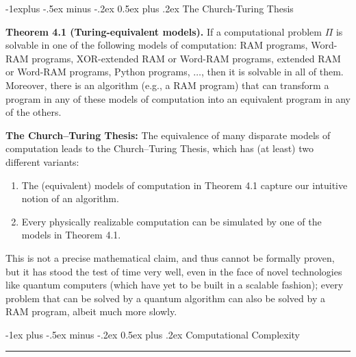 \documentclass[10pt,landscape]{article}
\makeatletter
\renewcommand{\section}{\@startsection{section}{1}{0mm}%
                                {-1ex plus -.5ex minus -.2ex}%
                                {0.5ex plus .2ex}%
                                {\normalfont\large\bfseries}}
\renewcommand{\subsection}{\@startsection{subsection}{2}{0mm}%
                                {-1explus -.5ex minus -.2ex}%
                                {0.5ex plus .2ex}%
                                {\normalfont\normalsize\bfseries}}
\makeatother
\begin{document}
\begin{multicols*}{3}
\subsection{The Church-Turing Thesis}

\textbf{Theorem 4.1 (Turing-equivalent models).} If a computational problem $\Pi$ is solvable in one of the following models of computation: RAM programs, Word-RAM programs, XOR-extended RAM or Word-RAM programs, extended RAM or Word-RAM programs, Python programs, $\ldots$, then it is solvable in all of them. Moreover, there is an algorithm (e.g., a RAM program) that can transform a program in any of these models of computation into an equivalent program in any of the others.

\smallskip

\textbf{The Church–Turing Thesis:} The equivalence of many disparate models of computation leads to the Church–Turing Thesis, which has (at least) two different variants:
\begin{enumerate}
  \item The (equivalent) models of computation in Theorem 4.1 capture our intuitive notion of an algorithm.
  \item Every physically realizable computation can be simulated by one of the models in Theorem 4.1.
\end{enumerate}
This is not a precise mathematical claim, and thus cannot be formally proven, but it has stood the test of time very well, even in the face of novel technologies like quantum computers (which have yet to be built in a scalable fashion); every problem that can be solved by a quantum algorithm can also be solved by a RAM program, albeit much more slowly.

\section{Computational Complexity}\smallskip \hrule height 2pt \smallskip


\end{multicols*}
\end{document}
